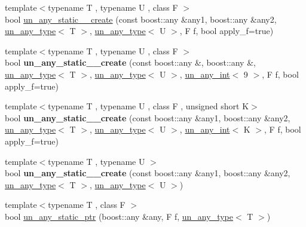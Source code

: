 \begin{DoxyCompactItemize}
\item 
{\footnotesize template$<$typename T , typename U , class F $>$ }\\bool \mbox{\hyperlink{group__boost__any__stuff_gaaf87cecb7f9c36476431ceb5bf943b45}{un\+\_\+any\+\_\+static\+\_\+\_\+create}} (const boost\+::any \&any1, boost\+::any \&any2, \mbox{\hyperlink{struct_s_m_spp__di__unipi__it_1_1un__any__type}{un\+\_\+any\+\_\+type}}$<$ T $>$, \mbox{\hyperlink{struct_s_m_spp__di__unipi__it_1_1un__any__type}{un\+\_\+any\+\_\+type}}$<$ U $>$, F f, bool apply\+\_\+f=true)
\item 
{\footnotesize template$<$typename T , typename U , class F $>$ }\\bool {\bfseries un\+\_\+any\+\_\+static\+\_\+\_\+create} (const boost\+::any \&, boost\+::any \&, \mbox{\hyperlink{struct_s_m_spp__di__unipi__it_1_1un__any__type}{un\+\_\+any\+\_\+type}}$<$ T $>$, \mbox{\hyperlink{struct_s_m_spp__di__unipi__it_1_1un__any__type}{un\+\_\+any\+\_\+type}}$<$ U $>$, \mbox{\hyperlink{struct_s_m_spp__di__unipi__it_1_1un__any__int}{un\+\_\+any\+\_\+int}}$<$ 9 $>$, F f, bool apply\+\_\+f=true)
\item 
{\footnotesize template$<$typename T , typename U , class F , unsigned short K$>$ }\\bool {\bfseries un\+\_\+any\+\_\+static\+\_\+\_\+create} (const boost\+::any \&any1, boost\+::any \&any2, \mbox{\hyperlink{struct_s_m_spp__di__unipi__it_1_1un__any__type}{un\+\_\+any\+\_\+type}}$<$ T $>$, \mbox{\hyperlink{struct_s_m_spp__di__unipi__it_1_1un__any__type}{un\+\_\+any\+\_\+type}}$<$ U $>$, \mbox{\hyperlink{struct_s_m_spp__di__unipi__it_1_1un__any__int}{un\+\_\+any\+\_\+int}}$<$ K $>$, F f, bool apply\+\_\+f=true)
\item 
{\footnotesize template$<$typename T , typename U $>$ }\\bool {\bfseries un\+\_\+any\+\_\+static\+\_\+\_\+create} (const boost\+::any \&any1, boost\+::any \&any2, \mbox{\hyperlink{struct_s_m_spp__di__unipi__it_1_1un__any__type}{un\+\_\+any\+\_\+type}}$<$ T $>$, \mbox{\hyperlink{struct_s_m_spp__di__unipi__it_1_1un__any__type}{un\+\_\+any\+\_\+type}}$<$ U $>$)
\item 
{\footnotesize template$<$typename T , class F $>$ }\\bool \mbox{\hyperlink{group__boost__any__stuff_ga52fc4cc92fd415dd9ba1ae8b68f44931}{un\+\_\+any\+\_\+static\+\_\+ptr}} (boost\+::any \&any, F f, \mbox{\hyperlink{struct_s_m_spp__di__unipi__it_1_1un__any__type}{un\+\_\+any\+\_\+type}}$<$ T $>$)
\item 

\end{DoxyCompactItemize}
